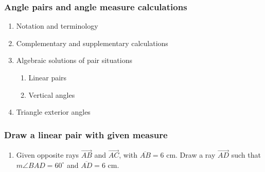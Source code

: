 \documentclass[12pt, oneside]{article}
\begin{document}
\subsubsection*{Angle pairs and angle measure calculations}
  \begin{enumerate}
  \item Notation and terminology
  \item Complementary and supplementary calculations
  \item Algebraic solutions of pair situations
  \begin{enumerate}
    \item Linear pairs
    \item Vertical angles
    \end{enumerate}
  \item Triangle exterior angles
  \end{enumerate}

\subsubsection*{Draw a linear pair with given measure}
  \begin{enumerate}
    \item Given opposite rays $\overrightarrow{AB}$ and $\overrightarrow{AC}$, with $\overline{AB}=6$ cm. Draw a ray $\overrightarrow{AD}$ such that $m \angle BAD=60^\circ$ and $\overline{AD}=6$ cm.
    \begin{center}
    \end{center}
  \end{enumerate}
\end{document}
